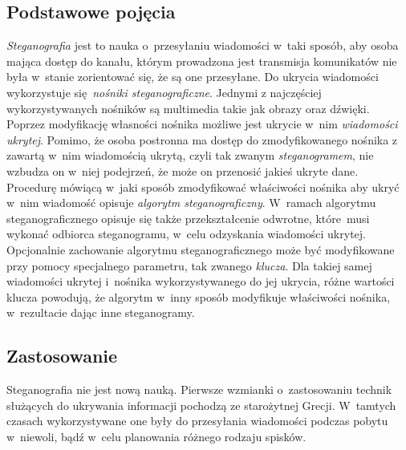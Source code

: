 \documentclass[a4paper, twoside, openright, 12pt]{report}
\begin{document}
        \subsection{Podstawowe pojęcia} \label{STEGANOGRAFIAPOJECIA}
        \emph{Steganografia} jest to nauka o~przesyłaniu wiadomości w~taki sposób, aby
        osoba mająca dostęp do kanału, którym prowadzona jest transmisja komunikatów
        nie była w~stanie zorientować się, że są one przesyłane.
        Do ukrycia wiadomości wykorzystuje się \emph{nośniki steganograficzne}\cite{STEGANOGRAFIASIECIOWAART}.
        Jednymi z najczęściej wykorzystywanych nośników są multimedia takie jak
        obrazy oraz dźwięki. Poprzez modyfikację własności nośnika możliwe jest
        ukrycie w~nim \emph{wiadomości ukrytej}. Pomimo, że osoba postronna ma
        dostęp do zmodyfikowanego nośnika z zawartą w~nim wiadomością ukrytą,
        czyli tak zwanym \emph{steganogramem}, nie wzbudza on w~niej podejrzeń,
        że może on przenosić jakieś ukryte dane. Procedurę mówiącą w~jaki sposób
        zmodyfikować właściwości nośnika aby ukryć w~nim wiadomość opisuje
        \emph{algorytm steganograficzny}. W~ramach algorytmu steganograficznego
        opisuje się także przekształcenie odwrotne, które musi
        wykonać odbiorca steganogramu, w~celu odzyskania wiadomości ukrytej.
        Opcjonalnie zachowanie algorytmu steganograficznego może być modyfikowane przy pomocy specjalnego
        parametru, tak zwanego \emph{klucza}.  Dla takiej samej wiadomości ukrytej i~nośnika
        wykorzystywanego do jej ukrycia, różne wartości klucza powodują, że algorytm
        w~inny sposób modyfikuje właściwości nośnika, w~rezultacie dając inne
        steganogramy.

        \subsection{Zastosowanie}
        Steganografia nie jest nową nauką. Pierwsze wzmianki o~zastosowaniu technik
        służących do ukrywania informacji pochodzą ze starożytnej Grecji\cite{STEGANOGRAPHYINTRO}.
        W~tamtych czasach wykorzystywane one były do przesyłania wiadomości
        podczas pobytu w~niewoli, bądź w~celu planowania różnego rodzaju spisków.
\end{document}
